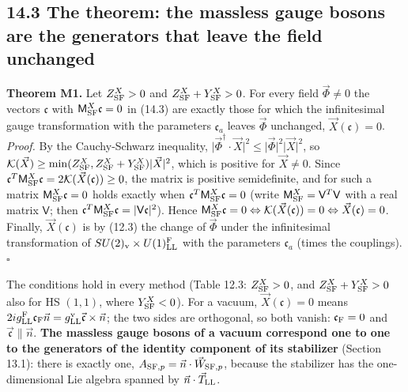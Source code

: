 \documentclass[
  10pt,
]{article}
\begin{document}
\hypertarget{the-theorem-the-massless-gauge-bosons-are-the-generators-that-leave-the-field-unchanged}{%
\subsection{14.3 The theorem: the massless gauge bosons are the
generators that leave the field
unchanged}\label{the-theorem-the-massless-gauge-bosons-are-the-generators-that-leave-the-field-unchanged}}

\textbf{Theorem M1.} Let \(Z^X_{\rm SF}>0\) and
\(Z^X_{\rm SF}+Y^X_{\rm SF}>0\). For every field \(\vec\Phi\neq0\) the
vectors \(\mathfrak c\) with \(\mathsf M^X_{\rm SF}\mathfrak c=0\) in
(14.3) are exactly those for which the infinitesimal gauge
transformation with the parameters \(\mathfrak c_a\) leaves \(\vec\Phi\)
unchanged, \(\vec X(\mathfrak c)=0\). \emph{Proof.} By the
Cauchy-Schwarz inequality,
\(\lvert\vec\Phi^\dagger\cdot\vec X\rvert^2\le\lvert\vec\Phi\rvert^2\lvert\vec X\rvert^2\),
so
\(\mathcal K(\vec X)\ge\min(Z^X_{\rm SF},Z^X_{\rm SF}+Y^X_{\rm SF})\lvert\vec X\rvert^2\),
which is positive for \(\vec X\neq0\). Since
\(\mathfrak c^T\mathsf M^X_{\rm SF}\mathfrak c=2\mathcal K(\vec X(\mathfrak c))\ge0\),
the matrix is positive semidefinite, and for such a matrix
\(\mathsf M^X_{\rm SF}\mathfrak c=0\) holds exactly when
\(\mathfrak c^T\mathsf M^X_{\rm SF}\mathfrak c=0\) (write
\(\mathsf M^X_{\rm SF}=\mathsf V^T\mathsf V\) with a real matrix
\(\mathsf V\); then
\(\mathfrak c^T\mathsf M^X_{\rm SF}\mathfrak c=\lvert\mathsf V\mathfrak c\rvert^2\)).
Hence
\(\mathsf M^X_{\rm SF}\mathfrak c=0\Leftrightarrow\mathcal K(\vec X(\mathfrak c))=0\Leftrightarrow\vec X(\mathfrak c)=0\).
Finally, \(\vec X(\mathfrak c)\) is by (12.3) the change of \(\vec\Phi\)
under the infinitesimal transformation of
\(SU(2)_{\rm v}\times U(1)^{\rm F}_{\rm LL}\) with the parameters
\(\mathfrak c_a\) (times the couplings). \(\square\)

The conditions hold in every method (Table 12.3: \(Z^X_{\rm SF}>0\), and
\(Z^X_{\rm SF}+Y^X_{\rm SF}>0\) also for HS \((1,1)\), where
\(Y^X_{\rm SF}<0\)). For a vacuum, \(\vec X(\mathfrak c)=0\) means
\(2ig^{\rm F}_{\rm LL}\mathfrak c_{\rm F}\vec n=g^{\rm v}_{\rm LL}\vec{\mathfrak c}\times\vec n\);
the two sides are orthogonal, so both vanish: \(\mathfrak c_{\rm F}=0\)
and \(\vec{\mathfrak c}\parallel\vec n\). \textbf{The massless gauge
bosons of a vacuum correspond one to one to the generators of the
identity component of its stabilizer} (Section 13.1): there is exactly
one, \(A_{{\rm SF},p}=\vec n\cdot\vec W_{{\rm SF},p}\), because the
stabilizer has the one-dimensional Lie algebra spanned by
\(\vec n\cdot\vec T_{\rm LL}\).
\end{document}
